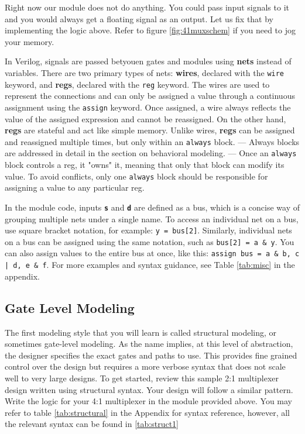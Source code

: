 \documentclass[12pt]{journal}
\begin{document}
Right now our module does not do anything. You could pass input signals to it and you would always get a floating signal as an output. Let us fix that by implementing the logic above. Refer to figure \vref{fig:41muxschem} if you need to jog your memory.
\clearpage
\begin{extra}[frametitle={On nets: wires and regs}]
    In Verilog, signals are passed betyouen gates and modules using \textbf{nets} instead of variables. There are two primary types of nets: \textbf{wires}, declared with the \texttt{wire} keyword, and \textbf{regs}, declared with the \texttt{reg} keyword. The wires are used to represent the connections and can only be assigned a value through a continuous assignment using the \texttt{assign} keyword. Once assigned, a wire always reflects the value of the assigned expression and cannot be reassigned. On the other hand, \textbf{regs} are stateful and act like simple memory. Unlike wires, \textbf{regs} can be assigned and reassigned multiple times, but only within an \texttt{always} block. --- Always blocks are addressed in detail in the section on behavioral modeling. --- Once an \texttt{always} block controls a reg, it "owns" it, meaning that only that block can modify its value. To avoid conflicts, only one \texttt{always} block should be responsible for assigning a value to any particular reg.
\end{extra}

\begin{extra}[frametitle={bus notation}]
    In the module code, inputs \textbf{\texttt{s}} and \textbf{\texttt{d}} are defined as a bus, which is a concise way of grouping multiple nets under a single name. To access an individual net on a bus, use square bracket notation, for example: \texttt{y = bus[2]}. Similarly, individual nets on a bus can be assigned using the same notation, such as \texttt{bus[2] = a \& y}. You can also assign values to the entire bus at once, like this: \texttt{assign bus = {a \& b, c | d, e \& f}}. For more examples and syntax guidance, see Table \ref{tab:misc} in the appendix.
\end{extra}

\subsection{Gate Level Modeling}
The first modeling style that you will learn is called structural modeling, or sometimes gate-level modeling. As the name implies, at this level of abstraction, the designer specifies the exact gates and paths to use. This provides fine grained control over the design but requires a more verbose syntax that does not scale well to very large designs. To get started, review this sample 2:1 multiplexer design written using structural syntax. Your design will follow a similar pattern. Write the logic for your 4:1 multiplexer in the module provided above. You may refer to table \ref{tab:structural} in the Appendix for syntax reference, however, all the relevant syntax can be found in \ref{tab:struct1}
\end{document}
